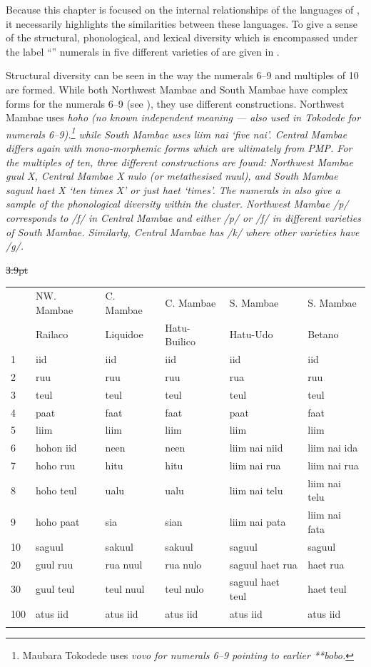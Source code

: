 Because this chapter is focused on the internal relationships
of the languages of ,
it necessarily highlights the similarities between these languages.
To give a sense of the structural,
phonological, and lexical diversity which is encompassed under
the label “” numerals in five different varieties
of  are given in .

Structural diversity can be seen in the way the numerals 6--9
and multiples of 10 are formed.
While both Northwest Mambae
and South Mambae have complex forms for the numerals 6--9 (see
), they use different constructions.
Northwest Mambae uses \it{hoho} (no known independent meaning
--- also used in Tokodede for numerals 6--9).\footnote{
		Maubara Tokodede uses \it{vovo} for numerals 6--9 pointing to earlier **bobo.}
while South Mambae uses \it{liim nai} ‘five \it{nai}’.
Central Mambae differs again with mono-morphemic forms which
are ultimately from PMP.
For the multiples of ten, three different constructions are found:
Northwest Mambae \it{guul} X,
Central Mambae X \it{nulo} (or metathesised \it{nuul}),
and South Mambae \it{saguul haet} X ‘ten times X’ or just \it{haet} ‘times’.
The numerals in  also give a sample of the phonological
diversity within the  cluster.
Northwest Mambae /p/ corresponds to /f/ in Central Mambae
and either /p/ or /f/ in different varieties of South Mambae.
Similarly, Central Mambae has /k/ where other varieties have /g/.

\begin{table}
	\centering{}
	\st{3.9pt}\begin{tabular}{llllll}\lsptoprule
	&	NW. Mambae	&	C. Mambae	&	C. Mambae	&	S. Mambae	&	S. Mambae\\
	&	Railaco	&	Liquidoe	&	Hatu-Builico	&	Hatu-Udo	&	Betano\\ \midrule
1	&	iid	&	iid	&	iid	&	iid	&	iid\\
2	&	ruu	&	ruu	&	ruu	&	rua	&	ruu\\
3	&	teul	&	teul	&	teul	&	teul	&	teul\\
4	&	paat	&	faat	&	faat	&	paat	&	faat\\
5	&	liim	&	liim	&	liim	&	liim	&	liim\\
6	&	hohon iid	&	neen	&	neen	&	liim nai niid	&	liim nai ida\\
7	&	hoho ruu	&	hitu	&	hitu	&	liim nai rua	&	liim nai rua\\
8	&	hoho teul	&	ualu	&	ualu	&	liim nai telu	&	liim nai telu\\
9	&	hoho paat	&	sia	&	sian	&	liim nai pata	&	liim nai fata\\
10	&	saguul	&	sakuul	&	sakuul	&	saguul	&	saguul\\
20	&	guul ruu	&	rua nuul	&	rua nulo	&	saguul haet rua	&	haet rua\\
30	&	guul teul	&	teul nuul	&	teul nulo	&	saguul haet teul	&	haet teul\\
100	&	atus iid	&	atus iid	&	atus iid	&	atus iid	&	atus iid\\
		\lspbottomrule
	\end{tabular}
\end{table}

